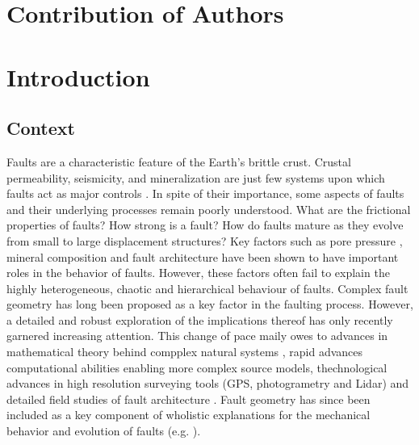 \documentclass[12pt,a4paper]{article}
\begin{document}
\section*{Contribution of Authors}

\section{Introduction}
\subsection{Context}
	Faults are a characteristic feature of the Earth’s brittle crust. Crustal permeability, seismicity, and mineralization are just few systems upon which faults act as major controls \cite{sibson1977fault, sibson1994crustal}. In spite of their importance, some aspects of faults and their underlying processes remain poorly understood. What are the frictional properties of faults? How strong is a fault? How do faults mature as they evolve from small to large displacement structures? Key factors such as pore pressure \cite{hubbert1959role, byerlee1990friction}, mineral composition \cite{summers1977note, chester1993internal, holsworth2001structure} and fault architecture \cite{chester1986implications, chester1987composite} have been shown to have important roles in the behavior of faults. However, these factors often fail to explain the highly heterogeneous, chaotic and hierarchical behaviour of faults. Complex fault geometry has long been proposed as a key factor in the faulting process. However, a detailed and robust exploration of the implications thereof has only recently garnered increasing attention. This change of pace maily owes to advances in mathematical theory behind compplex natural systems \cite{mandelbrot1984fractal, mandelbrot1985self}, rapid advances computational abilities enabling more complex source models, thechnological advances in high resolution surveying tools (GPS, photogrametry and Lidar) and detailed field studies of fault architecture  \cite{scholz1986fractal, candela2012roughness}. Fault geometry has since been included as a key component of wholistic explanations for the  mechanical behavior and evolution of faults (e.g. \cite{lay1982asperity, aki1984asperities, scholz1986fractal}). 
\end{document}
